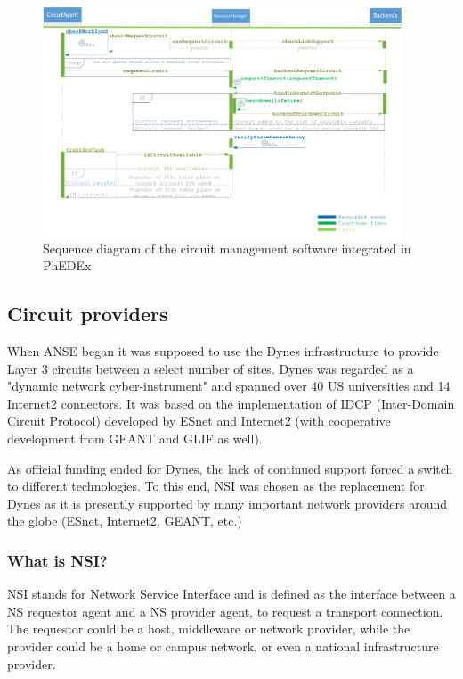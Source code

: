 \begin{figure}[h]
  \centering
  \includegraphics[width=0.95\textwidth]{Figures/Circuit_framework-sequence_diagram.png}
  \caption{Sequence diagram of the circuit management software integrated in PhEDEx}
  \label{fig:sequence_diagram}
\end{figure} 

\subsection{Circuit providers}

When ANSE began it was supposed to use the Dynes infrastructure to provide Layer 3 circuits 
between a select number of sites. Dynes was regarded as a "dynamic network cyber-instrument"
and spanned over 40 US universities and 14 Internet2 connectors. It was based on the 
implementation of IDCP\cite{IDCP} (Inter-Domain Circuit Protocol) developed by ESnet and Internet2 
(with cooperative development from GEANT and GLIF as well).

As official funding ended for Dynes, the lack of continued support forced a switch to different 
technologies. To this end, NSI was chosen as the replacement for Dynes as it is presently 
supported by many important network providers around the globe (ESnet, Internet2, GEANT, etc.)

\subsubsection{What is NSI?}

NSI stands for Network Service Interface and is defined as the interface between a
NS requestor agent and a NS provider agent, to request a transport connection.
The requestor could be a host, middleware or network provider, while the provider 
could be a home or campus network, or even a national infrastructure provider.

